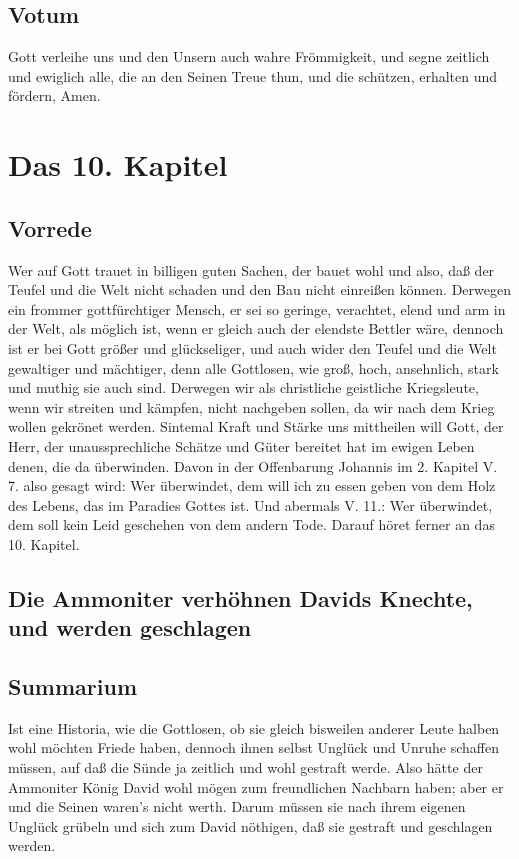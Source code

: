 \section{Votum}

Gott verleihe uns und den Unsern auch wahre Frömmigkeit, und segne zeitlich und ewiglich alle, die an den Seinen Treue thun, und die schützen, erhalten und fördern, Amen.

\chapter{Das 10. Kapitel}

\section{Vorrede}

Wer auf Gott trauet in billigen guten Sachen, der bauet wohl und also, daß der Teufel und die Welt nicht schaden und den Bau nicht einreißen können. Derwegen ein frommer gottfürchtiger Mensch, er sei so geringe, verachtet, elend und arm in der Welt, als möglich ist, wenn er gleich auch der elendste Bettler wäre, dennoch ist er bei Gott größer und glückseliger, und auch wider den Teufel und die Welt gewaltiger und mächtiger, denn alle Gottlosen, wie groß, hoch, ansehnlich, stark und muthig sie auch sind. Derwegen wir als christliche geistliche Kriegsleute, wenn wir streiten und kämpfen, nicht nachgeben sollen, da wir nach dem Krieg wollen gekrönet werden. Sintemal Kraft und Stärke uns mittheilen will Gott, der Herr, der unaussprechliche Schätze und Güter bereitet hat im ewigen Leben denen, die da überwinden. Davon in der Offenbarung Johannis im 2. Kapitel V. 7. also gesagt wird: Wer überwindet, dem will ich zu essen geben von dem Holz des Lebens, das im Paradies Gottes ist. Und abermals V. 11.: Wer überwindet, dem soll kein Leid geschehen von dem andern Tode. Darauf höret ferner an das 10. Kapitel.

\section{Die Ammoniter verhöhnen Davids Knechte, und werden geschlagen}

\section{Summarium}

Ist eine Historia, wie die Gottlosen, ob sie gleich bisweilen anderer Leute halben wohl möchten Friede haben, dennoch ihnen selbst Unglück und Unruhe schaffen müssen, auf daß die Sünde ja zeitlich und wohl gestraft werde. Also hätte der Ammoniter König David wohl mögen zum freundlichen Nachbarn haben; aber er und die Seinen waren's nicht werth. Darum müssen sie nach ihrem eigenen Unglück grübeln und sich zum David nöthigen, daß sie gestraft und geschlagen werden.

